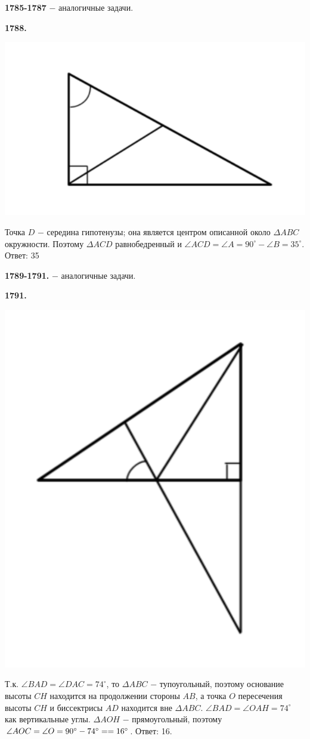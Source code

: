 \textbf{1785-1787} $-$ аналогичные задачи.

\textbf{1788.}

{\centering \includegraphics[width=0.5\linewidth]{Geometry/Content/9.png}
	
}

Точка $D$ $-$ середина гипотенузы; она является центром описанной около $\Delta ABC$ окружности. Поэтому $\Delta ACD$ равнобедренный и $\angle ACD = \angle A = 90^\circ - \angle B = 35^\circ.$ 
\newline \null \hspace*{\fill} Ответ: 35

\textbf{1789-1791.} $-$ аналогичные задачи.

\clearpage 

\textbf{1791.}

{\centering \includegraphics[width=0.4\linewidth]{Geometry/Content/10.png}
	
}

Т.к. $\angle BAD = \angle DAC = 74^\circ$, то $\Delta ABC$ $-$ тупоугольный, поэтому основание высоты $CH$ находится на продолжении стороны $AB$, а точка $O$ пересечения высоты $CH$ и биссектрисы $AD$ находится вне $\Delta ABC$. $\angle BAD = \angle OAH = 74^\circ$  как вертикальные углы. $\Delta AOH$ $-$ прямоугольный, поэтому $\angle AOC = \angle O = 90^\circ - 74^\circ =\linebreak = 16^\circ$. \newline \null \hspace*{\fill} Ответ: 16.

